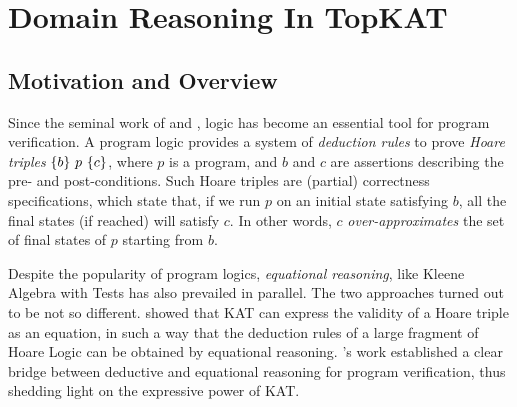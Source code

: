 \chapter{Domain Reasoning In TopKAT}
\label{chapter:TopKAT}
\thispagestyle{myheadings}

\section{Motivation and Overview}


Since the seminal work of \citet{Floyd67} and \citet{Hoare69}, logic has become
an essential tool for program verification.  A program logic provides a system
of \emph{deduction rules} to prove \emph{Hoare triples} \(\{b\}~p~\{c\}\),
where \(p\) is a program, and \(b\) and \(c\) are assertions describing the pre-
and post-conditions.  Such Hoare triples are (partial) correctness
specifications, which state that, if we run \(p\) on an initial state satisfying
\(b\), all the final states (if reached) will satisfy \(c\). In other words, \(c\)
\emph{over-approximates} the set of final states of \(p\) starting from \(b\). 

Despite the popularity of program logics, \emph{equational reasoning}, like Kleene Algebra with Tests has also prevailed in parallel.
The two approaches turned out to be not so different. \citet{Kozen_2000}
showed that KAT can express the validity of a Hoare triple as an equation, in
such a way that the deduction rules of a large fragment of Hoare Logic can be
obtained by equational reasoning.  \citeauthor{Kozen_2000}'s work
established a clear bridge between deductive and equational reasoning for
program verification, thus shedding light on the expressive power of KAT\@.

